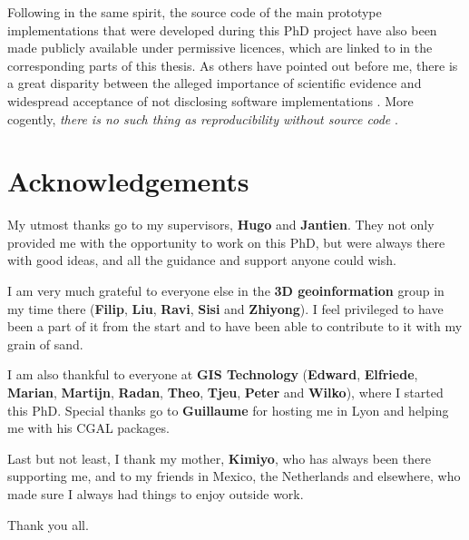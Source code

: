 Following in the same spirit, the source code of the main prototype implementations that were developed during this PhD project have also been made publicly available under permissive licences, which are linked to in the corresponding parts of this thesis.
As others have pointed out before me, there is a great disparity between the alleged importance of scientific evidence and widespread acceptance of not disclosing software implementations \citep{Morin12,Joppa13}.
More cogently, \emph{there is no such thing as reproducibility without source code} \citep{Ince12}.

\section*{Acknowledgements}

My utmost thanks go to my supervisors, \textbf{Hugo} and \textbf{Jantien}.
They not only provided me with the opportunity to work on this PhD, but were always there with good ideas, and all the guidance and support anyone could wish.

I am very much grateful to everyone else in the \textbf{3D geoinformation} group in my time there (\textbf{Filip}, \textbf{Liu}, \textbf{Ravi}, \textbf{Sisi} and \textbf{Zhiyong}).
I feel privileged to have been a part of it from the start and to have been able to contribute to it with my grain of sand.

I am also thankful to everyone at \textbf{GIS Technology} (\textbf{Edward}, \textbf{Elfriede}, \textbf{Marian}, \textbf{Martijn}, \textbf{Radan}, \textbf{Theo}, \textbf{Tjeu}, \textbf{Peter} and \textbf{Wilko}), where I started this PhD.
Special thanks go to \textbf{Guillaume} for hosting me in Lyon and helping me with his CGAL packages.

Last but not least, I thank my mother, \textbf{Kimiyo}, who has always been there supporting me, and to my friends in Mexico, the Netherlands and elsewhere, who made sure I always had things to enjoy outside work.

Thank you all.